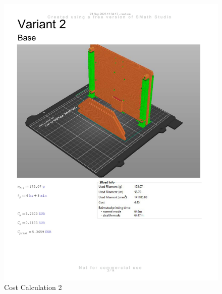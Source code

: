 \begin{figure}[H]
    \centering
    \includegraphics[width=\linewidth]{texs/appendix/data/cost1-02.jpg}
    \caption{Cost Calculation 2}
    \label{fig:cost-calculation-2}
\end{figure}

